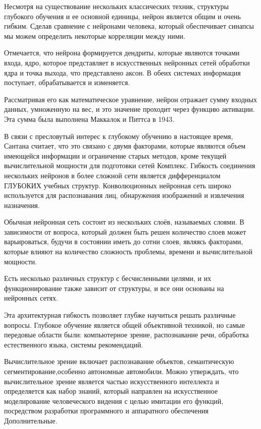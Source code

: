 Несмотря на существование нескольких классических техник, структуры глубокого обучения и ее основной единицы,
 нейрон является общим и очень гибким. Сделав сравнение с нейронами человека,
 который обеспечивает синапсы мы можем определить некоторые корреляции между ними. 


 Отмечается, что нейрона формируется дендриты, которые являются точками входа, ядро, 
 которое представляет в искусственных нейронных сетей обработки ядра и точка выхода, что представлено аксон. 
 В обеих системах информация поступает, обрабатывается и изменяется. 

 Рассматривая его как математическое уравнение, нейрон отражает сумму входных данных, 
 умноженную на вес, и это значение проходит через функцию активации. 
 Эта сумма была выполнена Маккалок и Питтса в 1943.

 В связи с пресловутый интерес к глубокому обучению в настоящее время, Сантана считает,
 что это связано с двумя факторами, которые являются объем имеющейся информации и ограничение старых методов,
 кроме текущей вычислительной мощности для подготовки сетей Комплекс. 
 Гибкость соединения нескольких нейронов в более сложной сети является дифференциалом ГЛУБОКИХ учебных структур.
 Конволюционных нейронная сеть широко используется для распознавания лиц, обнаружения изображений и извлечения назначения.

 Обычная нейронная сеть состоит из нескольких слоёв, называемых слоями.
 В зависимости от вопроса, который должен быть решен количество слоев может варьироваться, 
 будучи в состоянии иметь до сотни слоев, являясь факторами,
 которые влияют на количество сложность проблемы, 
 времени и вычислительной мощности. 

 Есть несколько различных структур с бесчисленными целями,
 и их функционирование также зависит от структуры,
 и все они основаны на нейронных сетях.


 Эта архитектурная гибкость позволяет глубже научиться решать различные вопросы.
 Глубокое обучение является общей объективной техникой, но самые передовые области были:
 компьютерное зрение, распознавание речи, обработка естественного языка, системы рекомендаций.

 Вычислительное зрение включает распознавание объектов, семантическую сегментирование,особенно автономные автомобили.
 Можно утверждать, что вычислительное зрение является частью искусственного интеллекта и определяется как набор знаний, 
 который направлен на искусственное моделирование человеческого видения с целью имитации его функций, 
 посредством разработки программного и аппаратного обеспечения Дополнительные.

